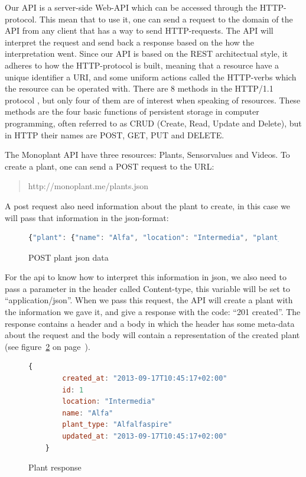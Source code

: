 Our API is a server-side Web-API which can be accessed through the HTTP-protocol. This mean that to use it, one can send a request to the domain of the API from any client that has a way to send HTTP-requests. The API will interpret the request and send back a response based on the how the interpretation went. Since our API is based on the REST architectual style, it adheres to how the HTTP-protocol is built, meaning that a resource have a unique identifier a URI, and some uniform actions called the HTTP-verbs which the resource can be operated with. There are 8 methods in the HTTP/1.1 protocol \citep[p.36]{fielding1999hypertext}, but only four of them are of interest when speaking of resources. These methods are the four basic functions of persistent storage in computer programming, often referred to as CRUD (Create, Read, Update and Delete), but in HTTP their names are POST, GET, PUT and DELETE. 

The Monoplant API have three resources: Plants, Sensorvalues and Videos. To create a plant, one can send a POST request to the URL:

\begin{quote}
http://monoplant.me/plants.json 
\end{quote}

A post request also need information about the plant to create, in this case we will pass that information in the json-format:

\begin{figure}
	\begin{lstlisting}[language=javascript]
	 {"plant": {"name": "Alfa", "location": "Intermedia", "plant_type": "Alfalfaspire"}} 
	\end{lstlisting}
	\caption{POST plant json data}
	\label{fig:postdata}
\end{figure}

For the api to know how to interpret this information in json, we also need to pass a parameter in the header called Content-type, this variable will be set to “application/json”. When we pass this request, the API will create a plant with the information we gave it, and give a response with the code: “201 created”. The response contains a header and a body in which the header has some meta-data about the request and the body will contain a representation of the created plant (see figure~\ref{fig:plantresponse} on page~\pageref{fig:plantresponse}).

\begin{figure}
	\begin{lstlisting}[language=javascript]
	{
		created_at: "2013-09-17T10:45:17+02:00"
		id: 1
		location: "Intermedia"
		name: "Alfa"
		plant_type: "Alfalfaspire"
		updated_at: "2013-09-17T10:45:17+02:00"
	}
	\end{lstlisting}
	\caption{Plant response}
	\label{fig:plantresponse}
\end{figure}

